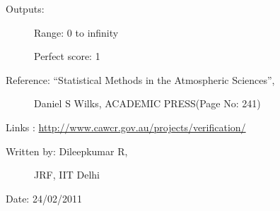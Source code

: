 \documentclass[letterpaper,10pt,english]{sphinxmanual}
\begin{document}
\begin{fulllineitems}
\begin{description}
\item[{Outputs:}] \leavevmode
Range: 0 to infinity

Perfect score: 1

\item[{Reference: ``Statistical Methods in the Atmospheric Sciences'',}] \leavevmode
Daniel S Wilks, ACADEMIC PRESS(Page No: 241)

\end{description}

Links : \href{http://www.cawcr.gov.au/projects/verification/}{http://www.cawcr.gov.au/projects/verification/}
\begin{description}
\item[{Written by: Dileepkumar R,}] \leavevmode
JRF, IIT Delhi

\end{description}

Date: 24/02/2011

\end{fulllineitems}

\end{document}
